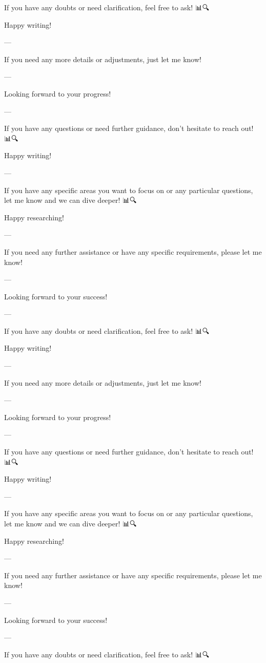 If you have any doubts or need clarification, feel free to ask! 📊🔍

Happy writing! 📝✨

--- 

If you need any more details or adjustments, just let me know! 🙌

--- 

Looking forward to your progress! 🚀🌟

--- 

If you have any questions or need further guidance, don't hesitate to reach out! 📊🔍

Happy writing! 📝✨

--- 

If you have any specific areas you want to focus on or any particular questions, let me know and we can dive deeper! 📊🔍

Happy researching! 📝🚀

--- 

If you need any further assistance or have any specific requirements, please let me know! 🙌

--- 

Looking forward to your success! 🚀🌟

--- 

If you have any doubts or need clarification, feel free to ask! 📊🔍

Happy writing! 📝✨

--- 

If you need any more details or adjustments, just let me know! 🙌

--- 

Looking forward to your progress! 🚀🌟

--- 

If you have any questions or need further guidance, don't hesitate to reach out! 📊🔍

Happy writing! 📝✨

--- 

If you have any specific areas you want to focus on or any particular questions, let me know and we can dive deeper! 📊🔍

Happy researching! 📝🚀

--- 

If you need any further assistance or have any specific requirements, please let me know! 🙌

--- 

Looking forward to your success! 🚀🌟

--- 

If you have any doubts or need clarification, feel free to ask! 📊🔍

